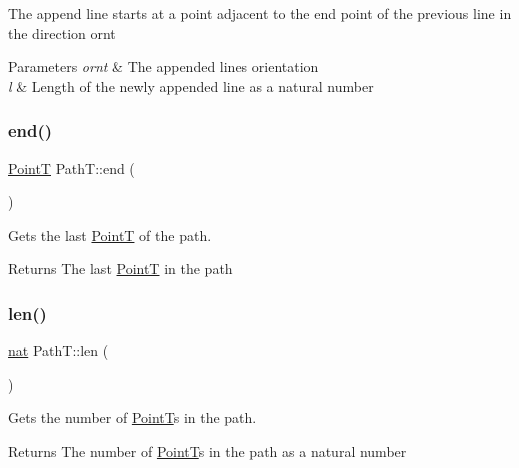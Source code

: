 The append line starts at a point adjacent to the end point of the previous line in the direction ornt 
\begin{DoxyParams}{Parameters}
{\em ornt} & The appended line\textquotesingle{}s orientation \\
\hline
{\em l} & Length of the newly appended line as a natural number \\
\hline
\end{DoxyParams}
\mbox{\label{class_path_t_a7bc47a3ad8ea135e82458381f9e6985b}} 
\subsubsection{\texorpdfstring{end()}{end()}}
{\footnotesize\ttfamily \mbox{\hyperlink{class_point_t}{PointT}} Path\+T\+::end (\begin{DoxyParamCaption}{ }\end{DoxyParamCaption})}



Gets the last \mbox{\hyperlink{class_point_t}{PointT}} of the path. 

\begin{DoxyReturn}{Returns}
The last \mbox{\hyperlink{class_point_t}{PointT}} in the path 
\end{DoxyReturn}
\mbox{\label{class_path_t_aacb8d7cde9698022b8c49c8d5cc94f5e}} 
\subsubsection{\texorpdfstring{len()}{len()}}
{\footnotesize\ttfamily \mbox{\hyperlink{_path_a_d_t_8h_a56638ee9d162e8cce3a15f92d2023d6e}{nat}} Path\+T\+::len (\begin{DoxyParamCaption}{ }\end{DoxyParamCaption})}



Gets the number of \mbox{\hyperlink{class_point_t}{PointT}}\textquotesingle{}s in the path. 

\begin{DoxyReturn}{Returns}
The number of \mbox{\hyperlink{class_point_t}{PointT}}\textquotesingle{}s in the path as a natural number 
\end{DoxyReturn}
\mbox{\label{class_path_t_ac9898c0a98d32ffeaa2d5dcd20699e4d}} 
